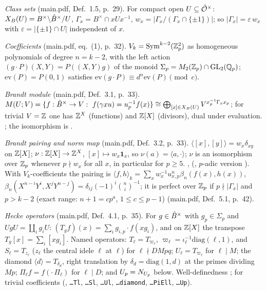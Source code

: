 \emph{Class sets} (main.pdf, Def.~1.5, p.~29). For compact open $U\subseteq\hat{\mathcal{O}}^\times$: $X_B(U)=B^\times\backslash\hat{B}^\times/U$,
$\Gamma_x=B^\times\cap xUx^{-1}$, $w_x=|\Gamma_x/(\Gamma_x\cap\{\pm1\})|$; so $|\Gamma_x|=\varepsilon\,w_x$ with
$\varepsilon=|\{\pm1\}\cap U|$ independent of $x$.

\emph{Coefficients} (main.pdf, eq.~(1), p.~32). $V_k=\mathrm{Sym}^{k-2}(\mathbb{Z}_p^2)$ as homogeneous polynomials of degree $n=k-2$, with the
left action $(g\cdot P)(X,Y)=P((X,Y)g)$ of the monoid $\Sigma_p=M_2(\mathbb{Z}_p)\cap\mathrm{GL}_2(\mathbb{Q}_p)$; $\mathrm{ev}(P)=P(0,1)$ satisfies
$\mathrm{ev}(g\cdot P)\equiv d^n\mathrm{ev}(P)\pmod c$. \stproved{}

\emph{Brandt module} (main.pdf, Def.~3.1, p.~33). $M(U;V)=\{f:\hat{B}^\times\to V:\ f(\gamma xu)=u_p^{-1}f(x)\}\cong
\bigoplus_{[x]\in X_B(U)}V^{x_p^{-1}\Gamma_xx_p}$; for trivial $V=\mathbb{Z}$ one has $\mathbb{Z}^X$ (functions) and $\mathbb{Z}[X]$ (divisors),
dual under evaluation. \stknown{} \cite[(4.1)--(4.2), Prop.~4.5]{Gr99}; the isomorphism is \stproved.

\emph{Brandt pairing and norm map} (main.pdf, Def.~3.2, p.~33). $\langle[x],[y]\rangle=w_x\delta_{xy}$ on $\mathbb{Z}[X]$;
$\nu:\mathbb{Z}[X]\to\mathbb{Z}^X$, $[x]\mapsto w_x\mathbf 1_x$, so $\nu(a)=\langle a,\cdot\rangle$; $\nu$ is an isomorphism over $\mathbb{Z}_p$ whenever
$p\nmid w_x$ for all $x$, in particular for $p\ge5$. \stproved{}, \stformal{} (,
$p$-adic version ). With $V_k$-coefficients the pairing is
$\langle f,h\rangle_k=\sum_xw_x^{-1}u_{x,p}^n\beta_n(f(x),h(x))$, $\beta_n(X^{n-i}Y^i,X^jY^{n-j})=\delta_{ij}(-1)^i\binom ni^{-1}$;
it is perfect over $\mathbb{Z}_p$ if $p\nmid|\Gamma_x|$ and $p>k-2$ (exact range: $n+1=cp^a$, $1\le c\le p-1$)
(main.pdf, Def.~5.1, p.~42). \stproved{}

\emph{Hecke operators} (main.pdf, Def.~4.1, p.~35). For $g\in\hat{B}^\times$ with $g_p\in\Sigma_p$ and $UgU=\coprod_ig_iU$:
$(T_gf)(x)=\sum_ig_{i,p}\cdot f(xg_i)$, and on $\mathbb{Z}[X]$ the transpose $T_g[x]=\sum_i[xg_i]$. Named operators:
$T_\ell=T_{\varpi_\ell}$, $\varpi_\ell=\iota_\ell^{-1}\mathrm{diag}(\ell,1)$, and $S_\ell=T_{z_\ell}$ ($z_\ell$ the central idele $\ell$
at $\ell$) for $\ell\nmid DMpq$; $U_\ell=T_{\varpi_\ell}$ for $\ell\mid M$; the diamond $\langle d\rangle=T_{\delta_d}$, right translation
by $\delta_d=\mathrm{diag}(1,d)$ at the primes dividing $Mp$; $\Pi_\ell f=f(\cdot\,\Pi_\ell)$ for $\ell\mid D$; and $U_p=N_{U_p}$ below.
Well-definedness \stproved; \stformal{} for trivial coefficients (, \texttt{\dots Tl},
\texttt{\dots Sl}, \texttt{\dots Ul}, \texttt{\dots diamond}, \texttt{\dots PiEll}, \texttt{\dots Up}).


